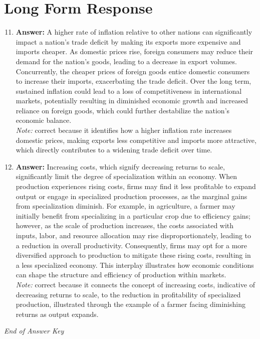 \documentclass[12pt]{article}
\begin{document}
\section*{Long Form Response}
\begin{enumerate}[label=\arabic*.]
\setcounter{enumi}{10}
\item \textbf{Answer:} A higher rate of inflation relative to other nations can significantly impact a nation's trade deficit by making its exports more expensive and imports cheaper. As domestic prices rise, foreign consumers may reduce their demand for the nation's goods, leading to a decrease in export volumes. Concurrently, the cheaper prices of foreign goods entice domestic consumers to increase their imports, exacerbating the trade deficit. Over the long term, sustained inflation could lead to a loss of competitiveness in international markets, potentially resulting in diminished economic growth and increased reliance on foreign goods, which could further destabilize the nation's economic balance.
\\ \textit{Note:} correct because it identifies how a higher inflation rate increases domestic prices, making exports less competitive and imports more attractive, which directly contributes to a widening trade deficit over time.
\item \textbf{Answer:} Increasing costs, which signify decreasing returns to scale, significantly limit the degree of specialization within an economy. When production experiences rising costs, firms may find it less profitable to expand output or engage in specialized production processes, as the marginal gains from specialization diminish. For example, in agriculture, a farmer may initially benefit from specializing in a particular crop due to efficiency gains; however, as the scale of production increases, the costs associated with inputs, labor, and resource allocation may rise disproportionately, leading to a reduction in overall productivity. Consequently, firms may opt for a more diversified approach to production to mitigate these rising costs, resulting in a less specialized economy. This interplay illustrates how economic conditions can shape the structure and efficiency of production within markets.
\\ \textit{Note:} correct because it connects the concept of increasing costs, indicative of decreasing returns to scale, to the reduction in profitability of specialized production, illustrated through the example of a farmer facing diminishing returns as output expands.
\end{enumerate}

\vfill
\noindent\textit{End of Answer Key}
\end{document}
